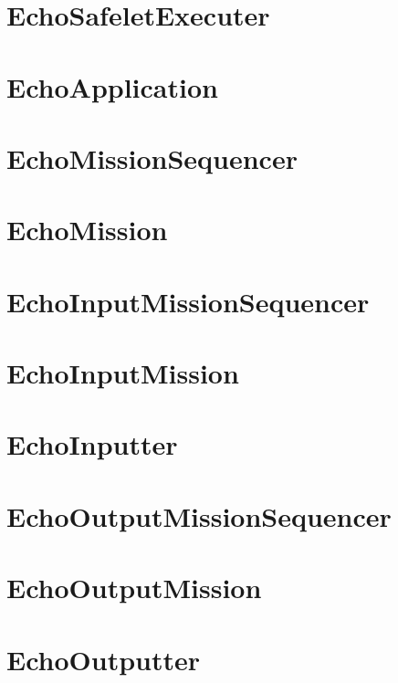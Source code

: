 \documentclass[10pt,a4paper,final]{article}
\begin{document}
\section{EchoSafeletExecuter}

\pagebreak

\section{EchoApplication}

\pagebreak

\section{EchoMissionSequencer}

\pagebreak

\section{EchoMission}

\pagebreak

\section{EchoInputMissionSequencer}

\pagebreak

\section{EchoInputMission}

\pagebreak

\section{EchoInputter}

\pagebreak


\section{EchoOutputMissionSequencer}

\pagebreak

\section{EchoOutputMission}

\pagebreak

\section{EchoOutputter}

\pagebreak
\end{document}
